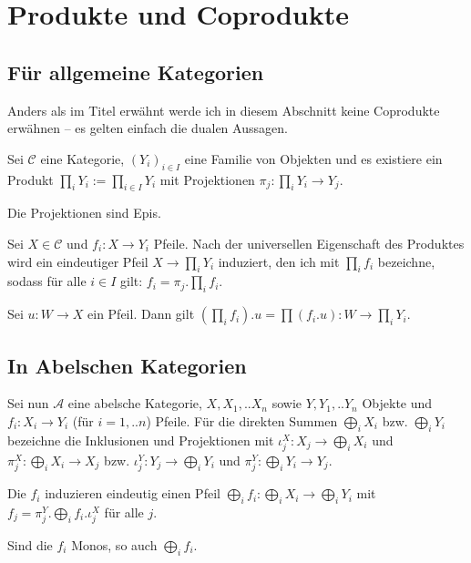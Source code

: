 \section{Produkte und Coprodukte}

\subsection{Für allgemeine Kategorien}

Anders als im Titel erwähnt werde ich in diesem Abschnitt keine Coprodukte erwähnen -- es gelten einfach die dualen Aussagen.

Sei $\mathcal C$ eine Kategorie, $(Y_i)_{i\in I}$ eine Familie von Objekten und es existiere ein Produkt $\prod_i Y_i := \prod_{i\in I} Y_i$ mit Projektionen $\pi_j : \prod_i Y_i \to Y_j$.

\begin{prop} Die Projektionen sind Epis.
\end{prop}

Sei $X\in \mathcal C$ und $f_i : X \to Y_i$ Pfeile. Nach der universellen Eigenschaft des Produktes wird ein eindeutiger Pfeil $X \to \prod_i Y_i$ induziert, den ich mit $\prod_i f_i$ bezeichne, sodass für alle $i\in I$ gilt: $f_i = \pi_j . \prod_i f_i$.

\begin{prop} Sei $u : W \to X$ ein Pfeil. Dann gilt $(\prod_i f_i) . u = \prod (f_i . u): W \to \prod_i Y_i$.
\end{prop}

\subsection{In Abelschen Kategorien}

Sei nun $\mathcal A$ eine abelsche Kategorie, $X,X_1,..X_n$ sowie $Y,Y_1,..Y_n$ Objekte und $f_i : X_i \to Y_i$ (für $i = 1,..n$) Pfeile.
Für die direkten Summen $\bigoplus_i X_i$ bzw. $\bigoplus_i Y_i$ bezeichne die Inklusionen und Projektionen mit $\iota^X_j : X_j \to \bigoplus_i X_i$ und $\pi^X_j : \bigoplus_i X_i \to X_j$ bzw. $\iota^Y_j : Y_j \to \bigoplus_i Y_i$ und $\pi^Y_j : \bigoplus_i Y_i \to Y_j$.

\begin{prop} Die $f_i$ induzieren eindeutig einen Pfeil $\bigoplus_i f_i : \bigoplus_i X_i \to \bigoplus_i Y_i$ mit $f_j = \pi^Y_j . \bigoplus_i f_i . \iota^X_j$ für alle $j$.
\end{prop}

\begin{prop} Sind die $f_i$ Monos, so auch $\bigoplus_i f_i$.
\end{prop}
